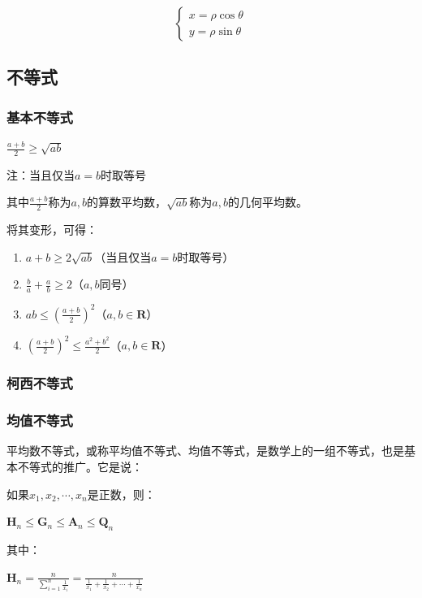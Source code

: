 \documentclass[UTF8]{ctexbook}
\newcommand{\upDownSum}[2]{\sum\limits_{#2}^{#1}}
\newcommand{\mathRealNumberCollection}{\mathbf{R}}
\begin{document}
{{{{    $$
      \begin{cases}
        x = \rho\cos\theta \\
        y = \rho\sin\theta
      \end{cases}
    $$
  }%

}%

\subsection{不等式}{

\subsubsection{基本不等式}{
  $\frac{a + b}{2} \geq \sqrt{ab}$

  注：当且仅当$a = b$时取等号

  其中$\frac{a+b}{2}$称为$a,b$的算数平均数，$\sqrt{ab}$称为$a,b$的几何平均数。

  将其变形，可得：
  \begin{enumerate}
    \item $a + b \geq 2\sqrt{ab}$（当且仅当$a = b$时取等号）
    \item $\frac{b}{a} + \frac{a}{b} \geq 2$（$a,b$同号）
    \item $ab \leq (\frac{a + b}{2})^2$（$a,b\in\mathRealNumberCollection$）
    \item $(\frac{a + b}{2})^2 \leq \frac{a^2 + b^2}{2}$（$a,b\in\mathRealNumberCollection$）
  \end{enumerate}
}%


\subsubsection{柯西不等式}{

}%

\subsubsection{均值不等式}{
平均数不等式，或称平均值不等式、均值不等式，是数学上的一组不等式，也是基本不等式的推广。它是说：

如果$x_{1},x_{2},\dotsm,x_{n}$是正数，则：

$\mathbf{H}_n \leq \mathbf{G}_n \leq \mathbf{A}_n \leq \mathbf{Q}_n$

其中：

$\mathbf{H}_n = \frac{n}{\upDownSum{n}{i = 1}\frac{1}{x_i}} = \frac{n}{\frac{1}{x_1} + \frac{1}{x_2} + \dotsm + \frac{1}{x_n}}$

}}}}
\end{document}
